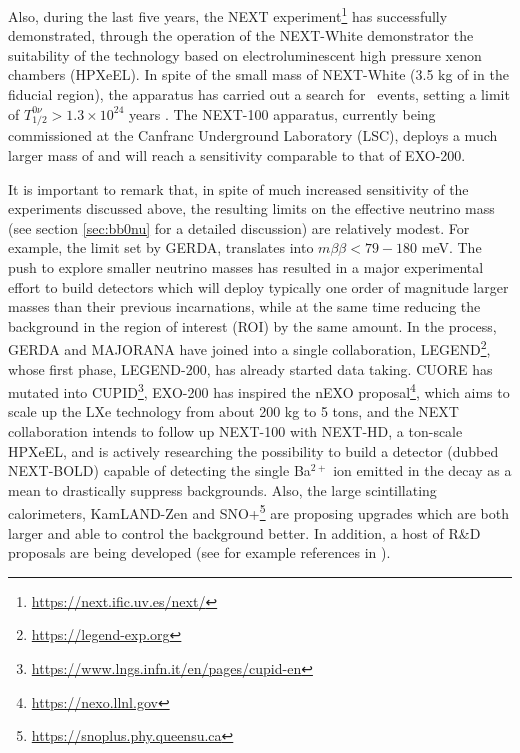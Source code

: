 Also, during the last five years, the NEXT experiment\footnote{\url{https://next.ific.uv.es/next/}} has successfully demonstrated, through the operation of the NEXT-White demonstrator the suitability of the technology based on electroluminescent high pressure xenon chambers (HPXeEL). In spite of the small mass of NEXT-White (3.5 kg of  in the fiducial region), the apparatus has carried out a search for \bbonu\ events, setting a limit of \mbox{$T^{0\nu}_{1/2} > 1.3 \times 10^{24}$} years  \cite{NEXT:2023daz}. The NEXT-100 apparatus, currently being commissioned at the Canfranc Underground Laboratory (LSC), deploys a much larger mass of  and will reach a sensitivity comparable to that of EXO-200.  

It is important to remark that, in spite of much increased sensitivity of the experiments discussed above, the resulting limits on the effective neutrino mass (see section \ref{sec:bb0nu} for a detailed discussion) are relatively modest. For example, the limit set by GERDA, translates into \mbox{$m\beta\beta < 79-180$} meV. The push to explore smaller neutrino masses has resulted in a major experimental effort to build 
detectors which will deploy typically one order of magnitude larger masses than their previous incarnations, while at the same time reducing the background in the region of interest (ROI) by the same amount. In the process, GERDA and MAJORANA have joined into a single collaboration, LEGEND\footnote{\url{https://legend-exp.org}}, whose first phase, LEGEND-200, has already started data taking. CUORE has mutated into CUPID\footnote{\url{https://www.lngs.infn.it/en/pages/cupid-en}}, EXO-200 has inspired the nEXO proposal\footnote{\url{https://nexo.llnl.gov}}, which aims to scale up the LXe technology from about 200 kg to 5 tons, and the NEXT collaboration intends to follow up NEXT-100 with NEXT-HD, a ton-scale HPXeEL, and is actively researching the possibility to build a detector (dubbed NEXT-BOLD) capable of detecting the single Ba$^{2+}$ ion emitted in the decay as a mean to drastically suppress backgrounds. Also, the large scintillating calorimeters, KamLAND-Zen and SNO+\footnote{\url{https://snoplus.phy.queensu.ca}} are proposing upgrades which are both larger and able to control the background better. In addition, a host of R\&D proposals are being developed (see for example references in \cite{Dell_Oro_2016}). 


